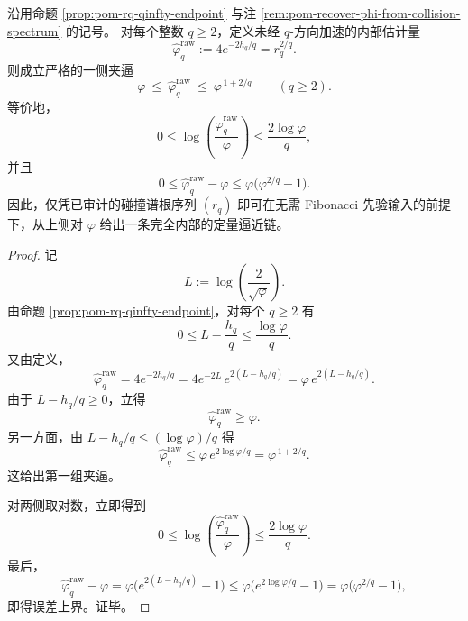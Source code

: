 \begin{theorem}\label{thm:pom-collision-spectrum-phi-onesided-approximation}
沿用命题 \ref{prop:pom-rq-qinfty-endpoint} 与注 \ref{rem:pom-recover-phi-from-collision-spectrum} 的记号。
对每个整数 \(q\ge 2\)，定义未经 \(q\)-方向加速的内部估计量
\[
\widehat\varphi_q^{\mathrm{raw}}
:=
4e^{-2h_q/q}
=
r_q^{2/q}.
\]
则成立严格的一侧夹逼
\[
\boxed{\;
\varphi\ \le\ \widehat\varphi_q^{\mathrm{raw}}\ \le\ \varphi^{\,1+2/q}
\qquad(q\ge 2).\;}
\]
等价地，
\[
0\le \log\!\left(\frac{\widehat\varphi_q^{\mathrm{raw}}}{\varphi}\right)\le \frac{2\log\varphi}{q},
\]
并且
\[
0\le \widehat\varphi_q^{\mathrm{raw}}-\varphi
\le
\varphi\bigl(\varphi^{2/q}-1\bigr).
\]
因此，仅凭已审计的碰撞谱根序列 \((r_q)\) 即可在无需 Fibonacci 先验输入的前提下，从上侧对 \(\varphi\) 给出一条完全内部的定量逼近链。
\end{theorem}
\begin{proof}
记
\[
L:=\log\!\left(\frac{2}{\sqrt{\varphi}}\right).
\]
由命题 \ref{prop:pom-rq-qinfty-endpoint}，对每个 \(q\ge 2\) 有
\[
0\le L-\frac{h_q}{q}\le \frac{\log\varphi}{q}.
\]
又由定义，
\[
\widehat\varphi_q^{\mathrm{raw}}
=
4e^{-2h_q/q}
=
4e^{-2L}\,e^{2(L-h_q/q)}
=
\varphi\,e^{2(L-h_q/q)}.
\]
由于 \(L-h_q/q\ge 0\)，立得
\[
\widehat\varphi_q^{\mathrm{raw}}\ge \varphi.
\]
另一方面，由 \(L-h_q/q\le (\log\varphi)/q\) 得
\[
\widehat\varphi_q^{\mathrm{raw}}
\le
\varphi\,e^{2\log\varphi/q}
=
\varphi^{\,1+2/q}.
\]
这给出第一组夹逼。

对两侧取对数，立即得到
\[
0\le \log\!\left(\frac{\widehat\varphi_q^{\mathrm{raw}}}{\varphi}\right)\le \frac{2\log\varphi}{q}.
\]
最后，
\[
\widehat\varphi_q^{\mathrm{raw}}-\varphi
=
\varphi\bigl(e^{2(L-h_q/q)}-1\bigr)
\le
\varphi\bigl(e^{2\log\varphi/q}-1\bigr)
=
\varphi\bigl(\varphi^{2/q}-1\bigr),
\]
即得误差上界。证毕。
\end{proof}

\endinput
